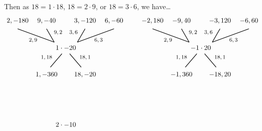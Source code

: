 \documentclass[11pt,letterpaper]{article}
\begin{document}
Then as $18= 1 \cdot 18$, $18= 2 \cdot 9$, or $18= 3 \cdot 6$, we have\dots
	\[
	\begin{tikzpicture}
	\node at (0,0) {$1 \cdot -20$};
	
	\node at (-1.7,0.4) {\footnotesize$2, 9$};
	\draw[line width=0.03cm,label={1}] (-0.6,0.3) -- (-2.5,1);
	\node at (-2.5,1.4) {$2, -180$};
	
	\node at (-0.4,0.8) {\footnotesize$9, 2$};
	\draw[line width=0.03cm,label={1}] (-0.6,0.3) -- (-1,1);
	\node at (-1,1.4) {$9, -40$};

	\node at (0.4,0.8) {\footnotesize$3, 6$};
	\draw[line width=0.03cm,label={1}] (0.6,0.3) -- (1,1);
	\node at (1,1.4) {$3, -120$};
	
	\node at (1.7,0.4) {\footnotesize$6, 3$};
	\draw[line width=0.03cm,label={1}] (0.6,0.3) -- (2.5,1);
	\node at (2.5,1.4) {$6, -60$};
	
	\node at (-1,-0.5) {\footnotesize$1, 18$};
	\draw[line width=0.03cm,label={1}] (-0.2,-0.3) -- (-0.8,-1);
	\node at (-1,-1.4) {$1, -360$};

	\node at (1,-0.5) {\footnotesize$18, 1$};
	\draw[line width=0.03cm,label={1}] (0.2,-0.3) -- (0.8,-1);
	\node at (1,-1.4) {$18, -20$};

	\tikzset{shift={(7,0)}}
	
	\node at (0,0) {$-1 \cdot 20$};
	
	\node at (-1.7,0.4) {\footnotesize$2, 9$};
	\draw[line width=0.03cm,label={1}] (-0.6,0.3) -- (-2.5,1);
	\node at (-2.5,1.4) {$-2, 180$};
	
	\node at (-0.4,0.8) {\footnotesize$9, 2$};
	\draw[line width=0.03cm,label={1}] (-0.6,0.3) -- (-1,1);
	\node at (-1,1.4) {$-9, 40$};

	\node at (0.4,0.8) {\footnotesize$3, 6$};
	\draw[line width=0.03cm,label={1}] (0.6,0.3) -- (1,1);
	\node at (1,1.4) {$-3, 120$};
	
	\node at (1.7,0.4) {\footnotesize$6, 3$};
	\draw[line width=0.03cm,label={1}] (0.6,0.3) -- (2.5,1);
	\node at (2.5,1.4) {$-6, 60$};
	
	\node at (-1,-0.5) {\footnotesize$1, 18$};
	\draw[line width=0.03cm,label={1}] (-0.2,-0.3) -- (-0.8,-1);
	\node at (-1,-1.4) {$-1, 360$};

	\node at (1,-0.5) {\footnotesize$18, 1$};
	\draw[line width=0.03cm,label={1}] (0.2,-0.3) -- (0.8,-1);
	\node at (1,-1.4) {$-18, 20$};
	
	\tikzset{shift={(-7,-4)}}
	
	\node at (0,0) {$2 \cdot -10$};
	

\end{tikzpicture}\]
\end{document}
